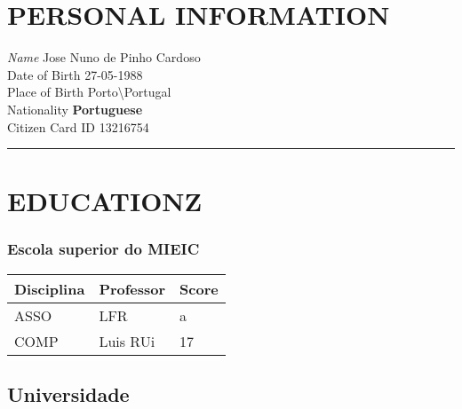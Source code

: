 \documentclass[]{article}
\date{}
\begin{document}
\section{PERSONAL INFORMATION}\label{personal-information}

\emph{Name} Jose Nuno de Pinho Cardoso\\
Date of Birth 27-05-1988\\
Place of Birth Porto\textbackslash{}Portugal\\
Nationality \textbf{Portuguese}\\
Citizen Card ID 13216754

\begin{center}\rule{0.5\linewidth}{\linethickness}\end{center}

\section{EDUCATIONZ}\label{educationz}

\subsubsection{Escola superior do MIEIC}\label{escola-superior-do-mieic}

\begin{longtable}[c]{@{}lll@{}}
\toprule
Disciplina & Professor & Score\tabularnewline
\midrule
\endhead
ASSO & LFR & a\tabularnewline
COMP & Luis RUi & 17\tabularnewline
\bottomrule
\end{longtable}

\subsection{Universidade}\label{universidade}
\end{document}
